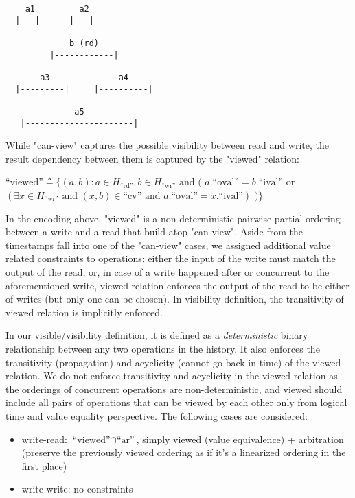 \begin{center}
\begin{verbatim}
    a1         a2
  |---|      |---|

             b (rd)
         |------------|

       a3              a4
  |---------|     |----------|

              a5
   |----------------------|
\end{verbatim}
\end{center}

While "can-view" captures the possible visibility between read and write, the
result dependency between them is captured by the "viewed" relation:

$\text{``viewed''} \triangleq \{(a, b) : a \in H_\text{``rd''}, b \in H_\text{``wr''} \text{ and } ($
$a.\text{``oval''} = b.\text{``ival''}$
$\text{or}$
$(\exists x \in H_\text{``wr''} \text{ and } (x, b) \in \text{``cv''} \text{ and } a.\text{``oval''} = x.\text{``ival''})$
$)\}$

In the encoding above, "viewed" is a non-deterministic pairwise partial ordering
between a write and a read that build atop "can-view". Aside from the timestamps
fall into one of the "can-view" cases, we assigned additional value related
constraints to operations: either the input of the write must match the output
of the read, or, in case of a write happened after or concurrent to the
aforementioned write, viewed relation enforces the output of the read to be
either of writes (but only one can be chosen). In visibility definition, the
transitivity of viewed relation is implicitly enforced.

In our visible/visibility definition, it is defined as a \textit{deterministic} binary
relationship between any two operations in the history. It also enforces the
transitivity (propagation) and acyclicity (cannot go back in time) of the viewed
relation. We do not enforce transitivity and acyclicity in the viewed relation
as the orderings of concurrent operations are non-deterministic, and viewed
should include all pairs of operations that can be viewed by each other only
from logical time and value equality perspective. The following cases are
considered:

\begin{itemize}
\item write-read: $\text{``viewed''} \cap \text{``ar''}$, simply viewed (value equivalence) +
  arbitration (preserve the previously viewed ordering as if it's a linearized
  ordering in the first place)

\item write-write: no constraints
\end{itemize}

